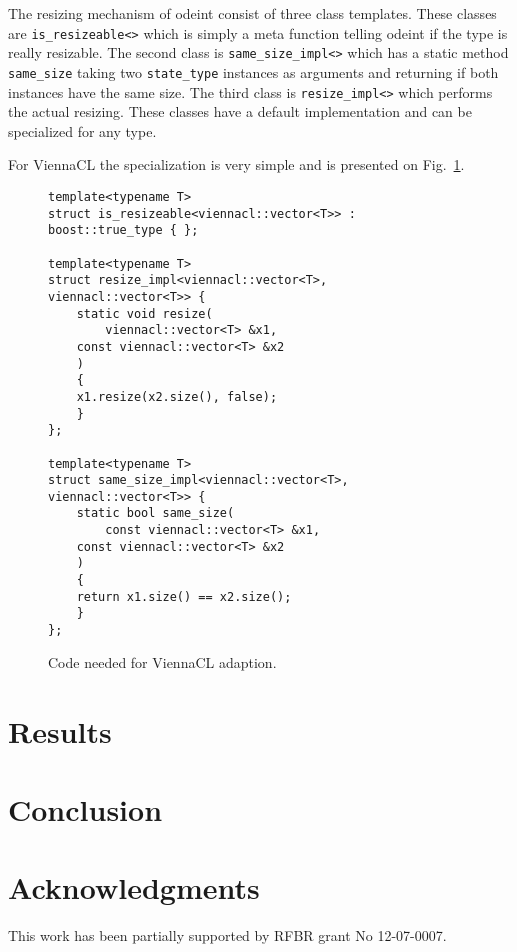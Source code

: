 \documentclass[1p]{elsarticle}
\newcommand{\code}[1]{\lstinline|#1|}
\newcommand{\figref}[1]{Fig.~\ref{#1}}
\begin{document}
The resizing mechanism of odeint consist of three class templates. These
classes are \code{is_resizeable<>} which is simply a meta function telling
odeint if the type is really resizable. The second class is
\code{same_size_impl<>} which has a static method \code{same_size} taking two
\code{state_type} instances as arguments and returning if both instances have
the same size. The third class is \code{resize_impl<>} which performs the
actual resizing. These classes have a default implementation and can be
specialized for any type.

For ViennaCL the specialization is very simple and is presented on
\figref{fig:adapt:viennacl}.
\begin{figure}
\begin{lstlisting}
template<typename T>
struct is_resizeable<viennacl::vector<T>> : boost::true_type { };

template<typename T>
struct resize_impl<viennacl::vector<T>, viennacl::vector<T>> {
    static void resize(
        viennacl::vector<T> &x1,
	const viennacl::vector<T> &x2
	)
    {
	x1.resize(x2.size(), false);
    }
};

template<typename T>
struct same_size_impl<viennacl::vector<T>, viennacl::vector<T>> {
    static bool same_size(
        const viennacl::vector<T> &x1,
	const viennacl::vector<T> &x2
	)
    {
	return x1.size() == x2.size();
    }
};
\end{lstlisting}
\caption{Code needed for ViennaCL adaption.}
\label{fig:adapt:viennacl}
\end{figure}


\section{Results}

\section{Conclusion}

\section{Acknowledgments}

This work has been partially supported by RFBR grant No 12-07-0007.

\nocite{*}


\end{document}
